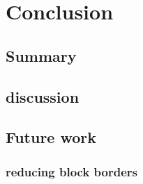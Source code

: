 \chapter{Conclusion}
\section{Summary}
\section{discussion}
\section{Future work}
\subsection{reducing block borders}
